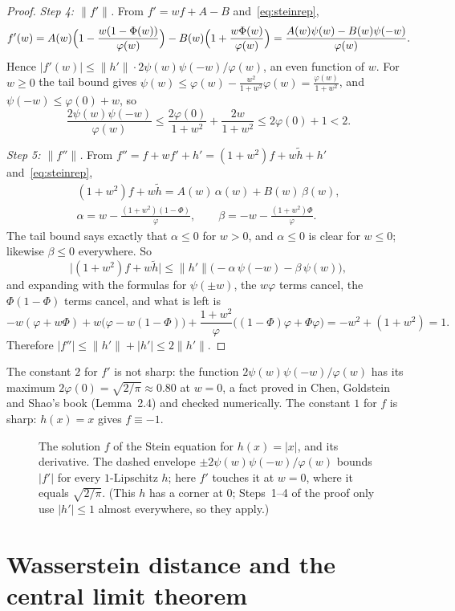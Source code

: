 \begin{proof}
\emph{Step 4: $\|f'\|$.} From $f'=wf+A-B$ and~\eqref{eq:steinrep},
\[
f'(w)=A(w)\Bigl(1-\frac{w(1-\Phi(w))}{\varphi(w)}\Bigr)-B(w)\Bigl(1+\frac{w\Phi(w)}{\varphi(w)}\Bigr)=\frac{A(w)\psi(w)-B(w)\psi(-w)}{\varphi(w)}.
\]
Hence $|f'(w)|\le\|h'\|\cdot2\psi(w)\psi(-w)/\varphi(w)$, an even function of $w$. For $w\ge0$ the tail bound gives
$\psi(w)\le\varphi(w)-\frac{w^2}{1+w^2}\varphi(w)=\frac{\varphi(w)}{1+w^2}$, and $\psi(-w)\le\varphi(0)+w$, so
\[
\frac{2\psi(w)\psi(-w)}{\varphi(w)}\le\frac{2\varphi(0)}{1+w^2}+\frac{2w}{1+w^2}\le2\varphi(0)+1<2.
\]

\emph{Step 5: $\|f''\|$.} From $f''=f+wf'+h'=(1+w^2)f+w\tilde h+h'$ and~\eqref{eq:steinrep},
\[
\begin{gathered}
(1+w^2)f+w\tilde h=A(w)\,\alpha(w)+B(w)\,\beta(w),\\
\alpha=w-\frac{(1+w^2)(1-\Phi)}{\varphi},\qquad\beta=-w-\frac{(1+w^2)\Phi}\varphi.
\end{gathered}
\]
The tail bound says exactly that $\alpha\le0$ for $w>0$, and $\alpha\le0$ is clear for $w\le0$; likewise $\beta\le0$ everywhere. So
\[
\bigl|(1+w^2)f+w\tilde h\bigr|\le\|h'\|\bigl(-\alpha\,\psi(-w)-\beta\,\psi(w)\bigr),
\]
and expanding with the formulas for $\psi(\pm w)$, the $w\varphi$ terms cancel, the $\Phi(1-\Phi)$ terms cancel, and what is left is
\[
-w(\varphi+w\Phi)+w\bigl(\varphi-w(1-\Phi)\bigr)+\frac{1+w^2}{\varphi}\bigl((1-\Phi)\varphi+\Phi\varphi\bigr)=-w^2+(1+w^2)=1.
\]
Therefore $|f''|\le\|h'\|+|h'|\le2\|h'\|$.
\end{proof}

The constant $2$ for $f'$ is not sharp: the function $2\psi(w)\psi(-w)/\varphi(w)$ has its maximum $2\varphi(0)=\sqrt{2/\pi}\approx0.80$ at $w=0$, a fact proved
in Chen, Goldstein and Shao's book (Lemma~2.4) and checked numerically. The constant $1$ for $f$ is sharp: $h(x)=x$ gives $f\equiv-1$.

\begin{figure}[ht]
\centering{}
\caption{The solution $f$ of the Stein equation for $h(x)=|x|$, and its derivative. The dashed envelope $\pm2\psi(w)\psi(-w)/\varphi(w)$ bounds $|f'|$ for every
$1$-Lipschitz $h$; here $f'$ touches it at $w=0$, where it equals $\sqrt{2/\pi}$. (This $h$ has a corner at $0$; Steps~1--4 of the proof only use $|h'|\le1$ almost everywhere, so they apply.)}
\label{fig:steinsol}
\end{figure}

\section{Wasserstein distance and the central limit theorem}

